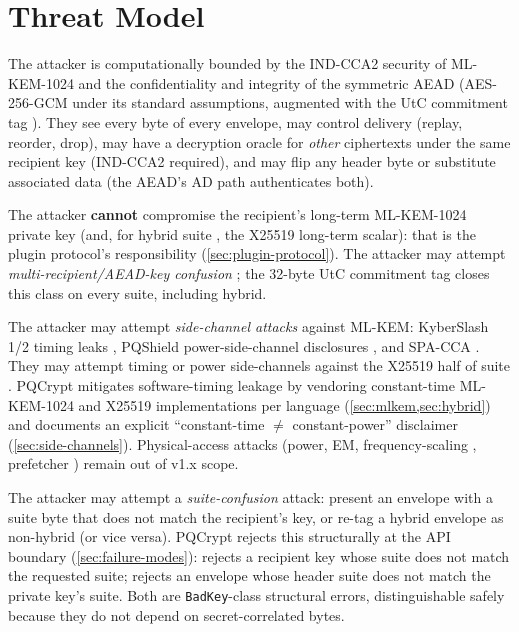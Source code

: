 \section{Threat Model}
\label{sec:threat-model}

The attacker is computationally bounded by the IND-CCA2 security of ML-KEM-1024 \citep{fips203,hofheinz2017fo} and the confidentiality and integrity of the symmetric AEAD (AES-256-GCM under its standard assumptions, augmented with the UtC commitment tag \citep{bellare2022commitment}). They see every byte of every envelope, may control delivery (replay, reorder, drop), may have a decryption oracle for \emph{other} ciphertexts under the same recipient key (IND-CCA2 required), and may flip any header byte or substitute associated data (the AEAD's AD path authenticates both).

The attacker \textbf{cannot} compromise the recipient's long-term ML-KEM-1024 private key (and, for hybrid suite , the X25519 long-term scalar): that is the plugin protocol's responsibility (\cref{sec:plugin-protocol}). The attacker may attempt \emph{multi-recipient/AEAD-key confusion} \citep{grubbs2017aead,albertini2020aead,len2021aead}; the 32-byte UtC commitment tag closes this class on every suite, including hybrid.

The attacker may attempt \emph{side-channel attacks} against ML-KEM: KyberSlash 1/2 timing leaks \citep{kyberslash}, PQShield power-side-channel disclosures \citep{pqshield2024}, and SPA-CCA \citep{guo2024spa}. They may attempt timing or power side-channels against the X25519 half of suite . PQCrypt mitigates software-timing leakage by vendoring constant-time ML-KEM-1024 and X25519 implementations per language (\cref{sec:mlkem,sec:hybrid}) and documents an explicit ``constant-time $\neq$ constant-power'' disclaimer (\cref{sec:side-channels}). Physical-access attacks (power, EM, frequency-scaling \citep{hertzbleed}, prefetcher \citep{gofetch}) remain out of v1.x scope.

The attacker may attempt a \emph{suite-confusion} attack: present an envelope with a suite byte that does not match the recipient's key, or re-tag a hybrid envelope as non-hybrid (or vice versa). PQCrypt rejects this structurally at the API boundary (\cref{sec:failure-modes}):  rejects a recipient key whose suite does not match the requested suite;  rejects an envelope whose header suite does not match the private key's suite. Both are \texttt{BadKey}-class structural errors, distinguishable safely because they do not depend on secret-correlated bytes.

